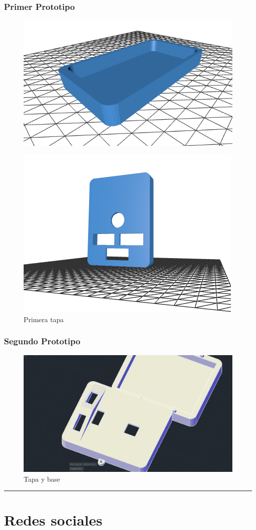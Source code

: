 \documentclass[12pt,a4paper]{article}
\newcommand{\separador}{\vspace{0.5cm}\noindent\rule{\linewidth}{0.5pt}\vspace{0.5cm}}
\begin{document}
\subsubsection{Primer Prototipo}
\begin{figure}[H]
    \centering
    \includegraphics[width=0.5\linewidth]{Carpeta tecnica/modelo baj1.png}
\end{figure}
\begin{figure}[H]
    \centering
    \includegraphics[width=0.5\linewidth]{Carpeta tecnica/primer tapa.png}
    \caption{Primera tapa}
\end{figure}

\subsubsection{Segundo Prototipo}

\begin{figure}[H]
    \centering
    \includegraphics[width=0.5\linewidth]{Carpeta tecnica/segundo proto.png}
    \caption{Tapa y base}
\end{figure}
\separador

\section{Redes sociales}
\end{document}
